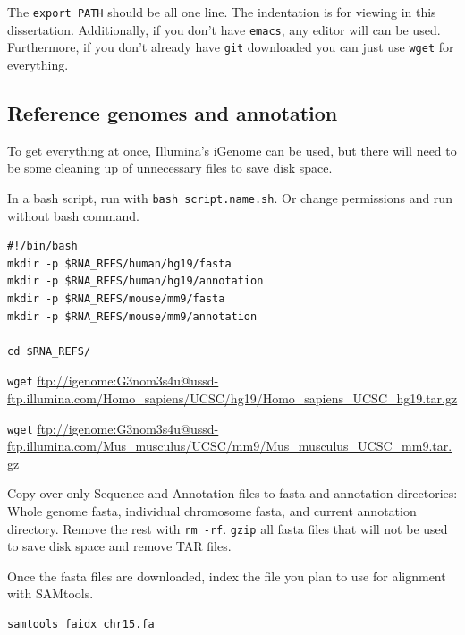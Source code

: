 The \texttt{export PATH} should be all one line. The indentation is for viewing in this dissertation. Additionally, if you don't have \texttt{emacs}, any editor will can be used. Furthermore, if you don't already have \texttt{git} downloaded you can just use \texttt{wget} for everything.

\subsection{Reference genomes and annotation}
To get everything at once, Illumina's iGenome can be used, but there will need to be some cleaning up of unnecessary files to save disk space.

In a bash script, run with \texttt{bash script.name.sh}. Or change permissions and run without bash command.

\begin{verbatim}
#!/bin/bash
mkdir -p $RNA_REFS/human/hg19/fasta
mkdir -p $RNA_REFS/human/hg19/annotation
mkdir -p $RNA_REFS/mouse/mm9/fasta
mkdir -p $RNA_REFS/mouse/mm9/annotation

cd $RNA_REFS/
\end{verbatim}

\texttt{wget} \url{ftp://igenome:G3nom3s4u@ussd-ftp.illumina.com/Homo_sapiens/UCSC/hg19/Homo_sapiens_UCSC_hg19.tar.gz}

\texttt{wget} \url{ftp://igenome:G3nom3s4u@ussd-ftp.illumina.com/Mus_musculus/UCSC/mm9/Mus_musculus_UCSC_mm9.tar.gz}

Copy over only Sequence and Annotation files to fasta and annotation directories: Whole genome fasta, individual chromosome fasta, and current annotation directory. Remove the rest with \texttt{rm -rf}. \texttt{gzip} all fasta files that will not be used to save disk space and remove TAR files.

Once the fasta files are downloaded, index the file you plan to use for alignment with SAMtools.
\begin{verbatim}
samtools faidx chr15.fa
\end{verbatim}

